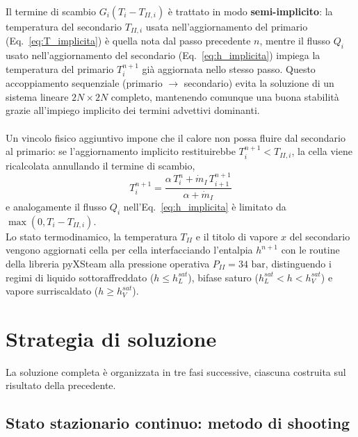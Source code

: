 \documentclass[12pt]{report}
\begin{document}
Il termine di scambio $G_i(T_i-T_{II,i})$ è trattato in modo \textbf{semi-implicito}: la temperatura del secondario $T_{II,i}$ usata nell'aggiornamento del primario (Eq.~\ref{eq:T_implicita}) è quella nota dal passo precedente $n$, mentre il flusso $Q_i$ usato nell'aggiornamento del secondario (Eq.~\ref{eq:h_implicita}) impiega la temperatura del primario $T_i^{n+1}$ già aggiornata nello stesso passo. Questo accoppiamento sequenziale (primario $\to$ secondario) evita la soluzione di un sistema lineare $2N\times 2N$ completo, mantenendo comunque una buona stabilità grazie all'impiego implicito dei termini advettivi dominanti.\\\\
Un vincolo fisico aggiuntivo impone che il calore non possa fluire dal secondario al primario: se l'aggiornamento implicito restituirebbe $T_i^{n+1} < T_{II,i}$, la cella viene ricalcolata annullando il termine di scambio,
\begin{equation}
    T_i^{n+1} = \frac{\alpha\, T_i^{n} + \dot m_I\, T_{i+1}^{n+1}}{\alpha + \dot m_I}
    \label{eq:T_clamp}
\end{equation}
e analogamente il flusso $Q_i$ nell'Eq.~\eqref{eq:h_implicita} è limitato da $\max(0, T_i-T_{II,i})$.\\
Lo stato termodinamico, la temperatura $T_{II}$ e il titolo di vapore $x$ del secondario vengono aggiornati cella per cella interfacciando l'entalpia $h^{n+1}$ con le routine della libreria pyXSteam alla pressione operativa $P_{II} = 34\text{ bar}$, distinguendo i regimi di liquido sottoraffreddato ($h \le h_L^{sat}$), bifase saturo ($h_L^{sat} < h < h_V^{sat}$) e vapore surriscaldato ($h \ge h_V^{sat}$).

\section{Strategia di soluzione}
\label{sec:metodo_soluzione}

La soluzione completa è organizzata in tre fasi successive, ciascuna costruita sul risultato della precedente.

\subsection{Stato stazionario continuo: metodo di shooting}
\end{document}

